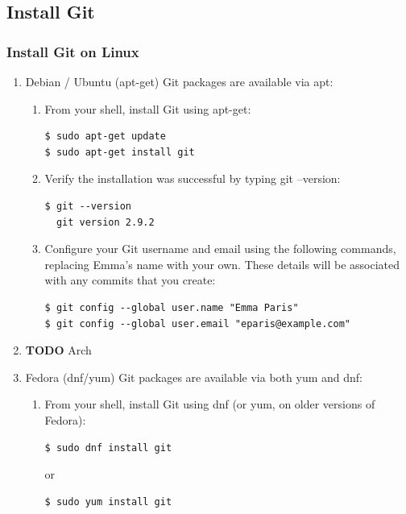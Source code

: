 \documentclass[11pt]{article}
\begin{document}
\subsection{Install Git}
\label{sec-1-2}
\subsubsection{Install Git on Linux}
\label{sec-1-2-1}
\begin{enumerate}
\item Debian / Ubuntu (apt-get)
\label{sec-1-2-1-1}
Git packages are available via apt:

\begin{enumerate}
\item From your shell, install Git using apt-get:
\begin{verbatim}
$ sudo apt-get update
$ sudo apt-get install git
\end{verbatim}

\item Verify the installation was successful by typing git --version:
\begin{verbatim}
$ git --version
  git version 2.9.2
\end{verbatim}

\item Configure your Git username and email using the following commands, replacing Emma's name with your own. These details will be associated with any commits that you create:
\begin{verbatim}
$ git config --global user.name "Emma Paris"
$ git config --global user.email "eparis@example.com"
\end{verbatim}
\end{enumerate}

\item {\bfseries\sffamily TODO} Arch
\label{sec-1-2-1-2}
\item Fedora (dnf/yum)
\label{sec-1-2-1-3}
Git packages are available via both yum and dnf:

\begin{enumerate}
\item From your shell, install Git using dnf (or yum, on older versions of Fedora):
\begin{verbatim}
$ sudo dnf install git
\end{verbatim}

or

\begin{verbatim}
$ sudo yum install git
\end{verbatim}


\end{enumerate}
\end{enumerate}
\end{document}
